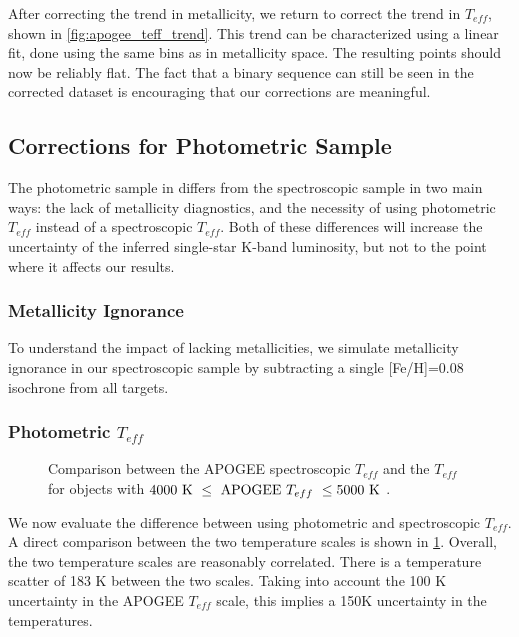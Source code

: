 \documentclass[manuscript]{aastex6}
\newcommand{\Teff}{\ensuremath{T_{eff}}}
\begin{document}
After correcting the trend in metallicity, we return to correct the trend in
\Teff{}, shown in \cref{fig:apogee_teff_trend}. This trend can be characterized
using a linear fit, done using the same bins as in metallicity space. The 
resulting points should now be reliably flat. The fact that a binary sequence 
can still be seen in the corrected dataset is encouraging that our 
corrections are meaningful.

\subsection{Corrections for Photometric Sample}

The photometric sample in \citep{McQuillan14} differs from the spectroscopic
sample in two main ways: the lack of metallicity diagnostics, and the necessity
of using photometric \Teff{} instead of a spectroscopic \Teff{}. Both of these
differences will increase the uncertainty of the inferred single-star K-band
luminosity, but not to the point where it affects our results.

\subsubsection{Metallicity Ignorance}

To understand the impact of lacking metallicities, we simulate metallicity
ignorance in our spectroscopic sample by subtracting a single [Fe/H]=0.08
isochrone from all targets. 

\subsubsection{Photometric \Teff{}}

\begin{figure}[htb]
    \centering
    \caption{Comparison between the APOGEE spectroscopic \Teff{} and the
        \citet{Pinsonneault12} \Teff{} for objects with \(4000 \textrm{ K } \le
    \textrm{ APOGEE \Teff{} } \le 5000 \textrm{ K }\).}\label{fig:teffdiff}
\end{figure}

We now evaluate the difference between using photometric and spectroscopic
\Teff{}. A direct comparison between the two temperature scales is shown in 
\cref{fig:teffdiff}. Overall, the two temperature scales are reasonably
correlated. There is a temperature scatter of 183 K between the two scales.
Taking into account the 100 K uncertainty in the APOGEE \Teff{} scale, this
implies a 150K uncertainty in the \citep{Pinsonneault12} temperatures. 
\end{document}
